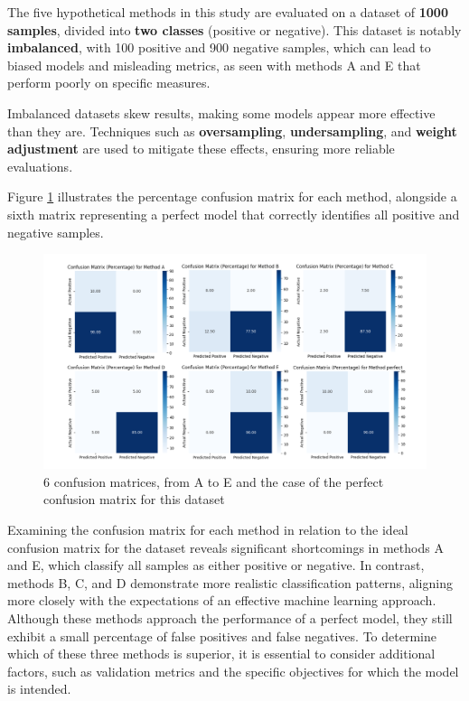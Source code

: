 \documentclass{llncs}
\begin{document}
\vspace{-20pt} %

The five hypothetical methods in this study are evaluated on a dataset of \textbf{1000 samples}, divided into \textbf{two classes} (positive or negative). This dataset is notably \textbf{imbalanced}, with 100 positive and 900 negative samples, which can lead to biased models and misleading metrics, as seen with methods A and E that perform poorly on specific measures.

Imbalanced datasets skew results, making some models appear more effective than they are. Techniques such as \textbf{oversampling}, \textbf{undersampling}, and \textbf{weight adjustment} are used to mitigate these effects, ensuring more reliable evaluations.

Figure \ref{fig:confusion} illustrates the percentage confusion matrix for each method, alongside a sixth matrix representing a perfect model that correctly identifies all positive and negative samples.



\begin{figure}[h!]
	\begin{center}  %
		\includegraphics[width=1\textwidth]{images/5_metodos.png}
		\caption{6 confusion matrices, from A to E and the case of the perfect confusion matrix for this dataset}
		\label{fig:confusion}
	\end{center}
\end{figure}

Examining the confusion matrix for each method in relation to the ideal confusion matrix for the dataset reveals significant shortcomings in methods A and E, which classify all samples as either positive or negative. In contrast, methods B, C, and D demonstrate more realistic classification patterns, aligning more closely with the expectations of an effective machine learning approach. Although these methods approach the performance of a perfect model, they still exhibit a small percentage of false positives and false negatives. To determine which of these three methods is superior, it is essential to consider additional factors, such as validation metrics and the specific objectives for which the model is intended.
\end{document}
